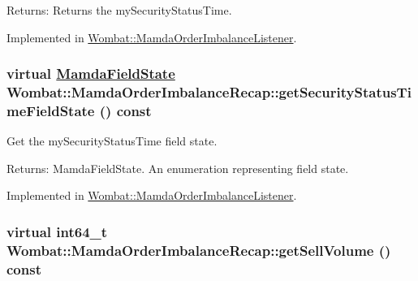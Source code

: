 \begin{Desc}
\item[Returns:]Returns the my\-Security\-Status\-Time. \end{Desc}


Implemented in \hyperlink{classWombat_1_1MamdaOrderImbalanceListener_1e72e1cbb405c48d7acab9ea19b3014e}{Wombat::Mamda\-Order\-Imbalance\-Listener}.\hypertarget{classWombat_1_1MamdaOrderImbalanceRecap_57f208148935324b7c942a10f8591433}{
\subsubsection[getSecurityStatusTimeFieldState]{\setlength{\rightskip}{0pt plus 5cm}virtual \hyperlink{namespaceWombat_93aac974f2ab713554fd12a1fa3b7d2a}{Mamda\-Field\-State} Wombat::Mamda\-Order\-Imbalance\-Recap::get\-Security\-Status\-Time\-Field\-State () const}}
\label{classWombat_1_1MamdaOrderImbalanceRecap_57f208148935324b7c942a10f8591433}


Get the my\-Security\-Status\-Time field state. 

\begin{Desc}
\item[Returns:]Mamda\-Field\-State. An enumeration representing field state. \end{Desc}


Implemented in \hyperlink{classWombat_1_1MamdaOrderImbalanceListener_7588daaf6700cd13510c480612e19fe0}{Wombat::Mamda\-Order\-Imbalance\-Listener}.\hypertarget{classWombat_1_1MamdaOrderImbalanceRecap_cb0e8ad41a7b39232e2ccb88a661d566}{
\subsubsection[getSellVolume]{\setlength{\rightskip}{0pt plus 5cm}virtual int64\_\-t Wombat::Mamda\-Order\-Imbalance\-Recap::get\-Sell\-Volume () const}}
\label{classWombat_1_1MamdaOrderImbalanceRecap_cb0e8ad41a7b39232e2ccb88a661d566}


